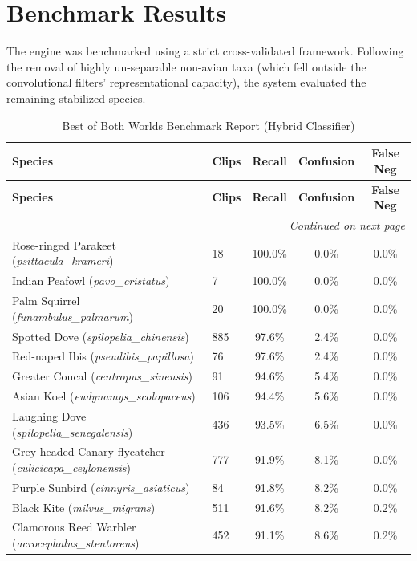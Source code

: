 \documentclass[11pt]{article}
\begin{document}
\section{Benchmark Results}
The engine was benchmarked using a strict cross-validated framework. Following the removal of highly un-separable non-avian taxa (which fell outside the convolutional filters' representational capacity), the system evaluated the remaining stabilized species.

\begin{longtable}{llccc}
\caption{Best of Both Worlds Benchmark Report (Hybrid Classifier)} \label{tab:results} \\
\toprule
\textbf{Species} & \textbf{Clips} & \textbf{Recall} & \textbf{Confusion} & \textbf{False Neg} \\
\midrule
\endfirsthead
\toprule
\textbf{Species} & \textbf{Clips} & \textbf{Recall} & \textbf{Confusion} & \textbf{False Neg} \\
\midrule
\endhead
\midrule
\multicolumn{5}{r}{\textit{Continued on next page}} \\
\endfoot
\bottomrule
\endlastfoot
Rose-ringed Parakeet (\textit{psittacula\_krameri}) & 18 & 100.0\% & 0.0\% & 0.0\% \\
Indian Peafowl (\textit{pavo\_cristatus}) & 7 & 100.0\% & 0.0\% & 0.0\% \\
Palm Squirrel (\textit{funambulus\_palmarum}) & 20 & 100.0\% & 0.0\% & 0.0\% \\
Spotted Dove (\textit{spilopelia\_chinensis}) & 885 & 97.6\% & 2.4\% & 0.0\% \\
Red-naped Ibis (\textit{pseudibis\_papillosa}) & 76 & 97.6\% & 2.4\% & 0.0\% \\
Greater Coucal (\textit{centropus\_sinensis}) & 91 & 94.6\% & 5.4\% & 0.0\% \\
Asian Koel (\textit{eudynamys\_scolopaceus}) & 106 & 94.4\% & 5.6\% & 0.0\% \\
Laughing Dove (\textit{spilopelia\_senegalensis}) & 436 & 93.5\% & 6.5\% & 0.0\% \\
Grey-headed Canary-flycatcher (\textit{culicicapa\_ceylonensis}) & 777 & 91.9\% & 8.1\% & 0.0\% \\
Purple Sunbird (\textit{cinnyris\_asiaticus}) & 84 & 91.8\% & 8.2\% & 0.0\% \\
Black Kite (\textit{milvus\_migrans}) & 511 & 91.6\% & 8.2\% & 0.2\% \\
Clamorous Reed Warbler (\textit{acrocephalus\_stentoreus}) & 452 & 91.1\% & 8.6\% & 0.2\% \\

\end{longtable}
\end{document}
